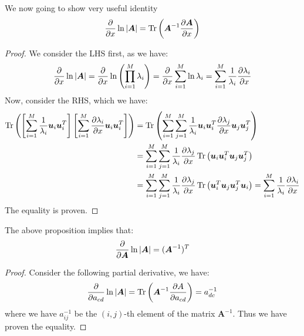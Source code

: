 \begin{proposition}
    We now going to show very useful identity
    \begin{equation*}
        \frac{\partial}{\partial x}\ln\left| \boldsymbol A \right| = \operatorname{Tr}\left( \boldsymbol A^{-1}\frac{\partial \boldsymbol A}{\partial x} \right)
    \end{equation*}
\end{proposition}
\begin{proof}
    We consider the LHS first, as we have:
    \begin{equation*}
        \frac{\partial}{\partial x}\ln\left| \boldsymbol A \right| = \frac{\partial}{\partial x} \ln\left( \prod^M_{i=1}\lambda_i \right) = \frac{\partial}{\partial x} \sum^M_{i=1}\ln\lambda_i = \sum^M_{i=1}\frac{1}{\lambda_i}\frac{\partial\lambda_i}{\partial x}  
    \end{equation*}
    Now, consider the RHS, which we have:
    \begin{equation*}
    \begin{aligned}
        \operatorname{Tr}\left( \left[ \sum^M_{i=1}\frac{1}{\lambda_i}\boldsymbol u_i\boldsymbol u_i^T \right] \left[ \sum^M_{i=1}\frac{\partial\lambda_i}{\partial x}\boldsymbol u_i\boldsymbol u_i^T \right]  \right) &= \operatorname{Tr}\left( \sum^M_{i=1}\sum^M_{j=1}\frac{1}{\lambda_i}\boldsymbol u_i\boldsymbol u_i^T\frac{\partial\lambda_j}{\partial x}\boldsymbol u_j\boldsymbol u_j^T \right) \\
        &= \sum^M_{i=1}\sum^M_{j=1}\frac{1}{\lambda_i}\frac{\partial \lambda_j}{\partial x}\operatorname{Tr}\left( \boldsymbol u_i\boldsymbol u_i^T\boldsymbol u_j\boldsymbol u_j^T \right) \\
        &= \sum^M_{i=1}\sum^M_{j=1}\frac{1}{\lambda_i}\frac{\partial \lambda_j}{\partial x}\operatorname{Tr}\left( \boldsymbol u_i^T\boldsymbol u_j\boldsymbol u_j^T\boldsymbol u_i \right) = \sum^M_{i=1}\frac{1}{\lambda_i}\frac{\partial \lambda_i}{\partial x} \\
    \end{aligned}
    \end{equation*}
    The equality is proven. 
\end{proof}

\begin{corollary}
    The above proposition implies that:
    \begin{equation*}
        \frac{\partial}{\partial \boldsymbol A}\ln\left| \boldsymbol A \right| = (\boldsymbol A^{-1})^T
    \end{equation*}
\end{corollary}
\begin{proof}
    Consider the following partial derivative, we have:
    \begin{equation*}
        \frac{\partial}{\partial a_{cd}} \ln\left| \boldsymbol A \right| = \operatorname{Tr}\left( \boldsymbol A^{-1} \frac{\partial A}{\partial a_{cd}} \right) = a^{-1}_{dc} 
    \end{equation*}
    where we have $a^{-1}_{ij}$ be the $(i,j)$-th element of the matrix $\boldsymbol A^{-1}$. Thus we have proven the equality. 
\end{proof}

